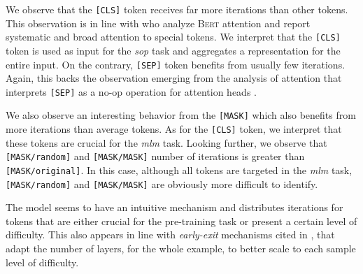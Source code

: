 We observe that the \texttt{[CLS]} token receives far more iterations than other tokens. This observation is in line with \textcite{clark_19} who analyze \textsc{Bert}  attention and report systematic and broad attention to special tokens. We interpret that the \texttt{[CLS]} token is used as input for the \textit{sop} task and aggregates a representation for the entire input. On the contrary, \texttt{[SEP]} token benefits from usually few iterations. Again, this backs  the observation emerging from the analysis of attention that interprets \texttt{[SEP]} as a no-op operation for attention heads \parencite{clark_19}.


We also observe an interesting behavior from the \texttt{[MASK]} which also benefits from more iterations than average tokens. As for the \texttt{[CLS]} token, we interpret that these tokens are crucial for the \textit{mlm} task. Looking further, we observe that \texttt{[MASK/random]} and \texttt{[MASK/MASK]} number of iterations is greater than \texttt{[MASK/original]}. In this case, although all tokens are targeted in the \textit{mlm} task, \texttt{[MASK/random]} and \texttt{[MASK/MASK]} are  obviously more difficult to identify.

The model seems to have an intuitive mechanism and distributes iterations for tokens that are either crucial for the pre-training task or present a certain level of difficulty. This also appears in line with \textit{early-exit} mechanisms cited in , that adapt the number of layers, for the whole example, to better scale to each sample level of difficulty.

